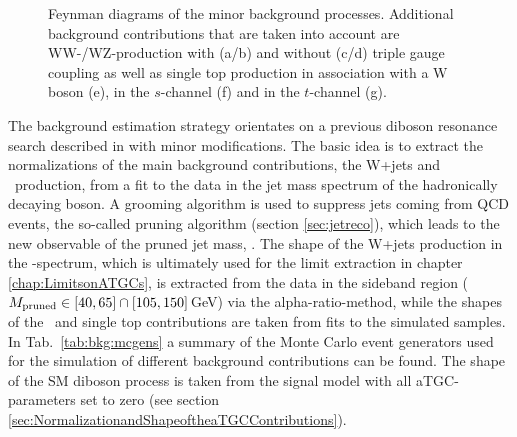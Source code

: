 \begin{figure}[]
	\centering
	\caption[Feynman diagrams of the minor background processes]{Feynman diagrams of the minor background processes. Additional background contributions that are taken into account are WW-/WZ-production with (a/b) and without (c/d) triple gauge coupling as well as single top production in association with a W boson (e), in the $s$-channel (f) and in the $t$-channel (g).}
\end{figure}

\noindent The background estimation strategy orientates on a previous diboson resonance search described in \cite{resonancepas} with minor modifications. The basic idea is to extract the normalizations of the main background contributions, the W+jets and \ttbar \ production, from a fit to the data in the jet mass spectrum of the hadronically decaying boson. A grooming algorithm is used to suppress jets coming from QCD events, the so-called pruning algorithm (section \ref{sec:jetreco}), which leads to the new observable of the pruned jet mass, \Mpr . The shape of the W+jets production in the \MWV -spectrum, which is ultimately used for the limit extraction in chapter \ref{chap:LimitsonATGCs}, is extracted from the data in the sideband region ($M_\mathrm{pruned} \in [40,65] \cap [105,150]$\,GeV) via the alpha-ratio-method, while the shapes of the \ttbar \ and single top contributions are taken from fits to the simulated samples. In Tab.~\ref{tab:bkg:mcgens} a summary of the Monte Carlo event generators used for the simulation of different background contributions can be found. The shape of the SM diboson process is taken from the signal model with all aTGC-parameters set to zero (see section \ref{sec:NormalizationandShapeoftheaTGCContributions}).\\

